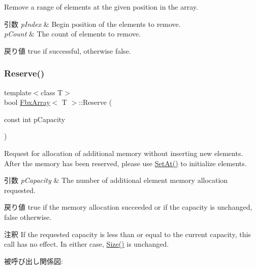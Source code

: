 Remove a range of elements at the given position in the array. 
\begin{DoxyParams}{引数}
{\em p\+Index} & Begin position of the elements to remove. \\
\hline
{\em p\+Count} & The count of elements to remove. \\
\hline
\end{DoxyParams}
\begin{DoxyReturn}{戻り値}
{\ttfamily true} if successful, otherwise {\ttfamily false}. 
\end{DoxyReturn}
\mbox{\label{class_fbx_array_a7d5a64be591ee59708079c2c5fe0dd1b}} 
\subsubsection{\texorpdfstring{Reserve()}{Reserve()}}
{\footnotesize\ttfamily template$<$class T$>$ \\
bool \hyperlink{class_fbx_array}{Fbx\+Array}$<$ T $>$\+::Reserve (\begin{DoxyParamCaption}\item[{const int}]{p\+Capacity }\end{DoxyParamCaption})}

Request for allocation of additional memory without inserting new elements. After the memory has been reserved, please use \hyperlink{class_fbx_array_a5229637f8e7dbee48fb8af9d03ecde14}{Set\+At()} to initialize elements. 
\begin{DoxyParams}{引数}
{\em p\+Capacity} & The number of additional element memory allocation requested. \\
\hline
\end{DoxyParams}
\begin{DoxyReturn}{戻り値}
{\ttfamily true} if the memory allocation succeeded or if the capacity is unchanged, {\ttfamily false} otherwise. 
\end{DoxyReturn}
\begin{DoxyRemark}{注釈}
If the requested capacity is less than or equal to the current capacity, this call has no effect. In either case, \hyperlink{class_fbx_array_aa76a0ceaf4b13a2acec7c0cdd1c08362}{Size()} is unchanged. 
\end{DoxyRemark}
被呼び出し関係図\+:
\mbox{\label{class_fbx_array_adc40ba9746e3d8586a525a3347c7cc4d}} 
